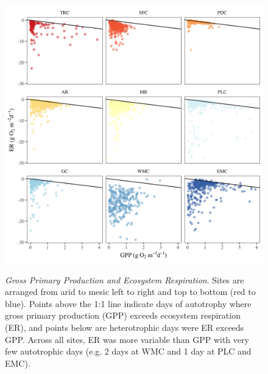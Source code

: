 \begin{figure}[htb]
\begin{center}
\includegraphics[scale=0.2]{Figs/GPPvER.png}
\caption[Gross Primary Production and Ecosystem Respiration]{\textit{Gross Primary Production and Ecosystem Respiration}. Sites are arranged from arid to mesic left to right and top to bottom (red to blue). Points above the 1:1 line indicate days of autotrophy where gross primary production (GPP) exceeds ecosystem respiration (ER), and points below are heterotrophic days were ER exceeds GPP. Across all sites, ER was more variable than GPP with very few autotrophic days (e.g. 2 days at WMC and 1 day at PLC and EMC).}
\small 
\label{fig:GPPvER}
\end{center}
\end{figure}

